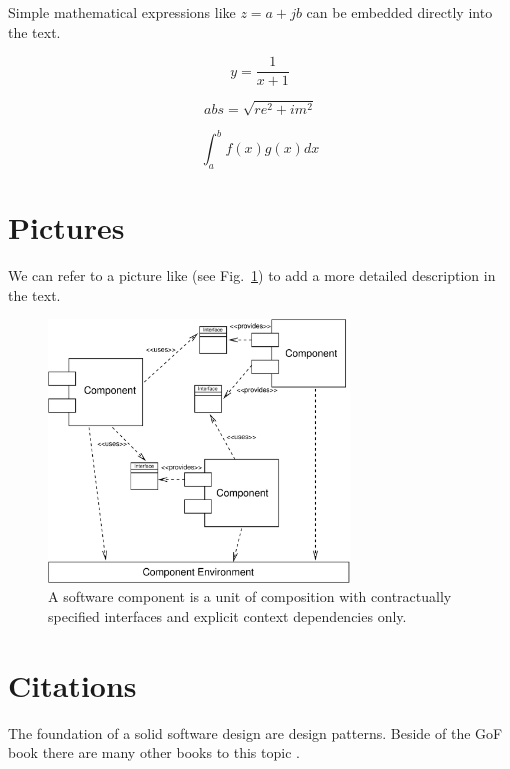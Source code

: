 \begin{appendix}
Simple mathematical expressions like $z=a+jb$ can be embedded directly into the
text.

\begin{displaymath}
y=\frac{1}{x+1}
\end{displaymath}


\begin{displaymath}
abs = \sqrt{re^2 + im^2}
\end{displaymath}

\begin{displaymath}
\int_{a}^{b} f(x)g(x)dx
\end{displaymath}

\newpage


\section{Pictures}

We can refer to a picture like (see Fig.~\ref{ComponentDef}) to
add a more detailed description in the text.

\begin{figure}[htbp]
    \centering
    \includegraphics [width=8cm,angle=30] {figures/Environment}
    \caption{A software component is a unit of composition with 
        contractually specified interfaces and explicit context 
		dependencies only.}
    \label{ComponentDef}
\end{figure}



\section{Citations}

The foundation of a solid software design are design patterns.
Beside of the GoF book \cite[S. 190]{Gamma95} there are many other books to this
topic \cite[S. 999]{Marinescu02} 
\cite{Wick2005} \cite{Gamma95}.

\end{appendix}
